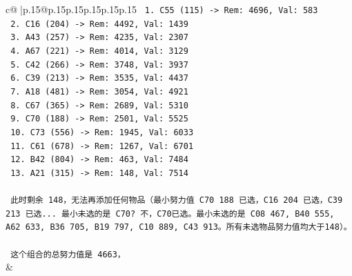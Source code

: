 \documentclass{article}
\begin{document}
{\begin{supertabular}{c@{$\;$}|p{.15\linewidth}@{}p{.15\linewidth}p{.15\linewidth}p{.15\linewidth}p{.15\linewidth}p{.15\linewidth}}
{{{\texttt{   1. C55 (115) {-}> Rem: 4696, Val: 583} \\
\texttt{   2. C16 (204) {-}> Rem: 4492, Val: 1439} \\
\texttt{   3. A43 (257) {-}> Rem: 4235, Val: 2307} \\
\texttt{   4. A67 (221) {-}> Rem: 4014, Val: 3129} \\
\texttt{   5. C42 (266) {-}> Rem: 3748, Val: 3937} \\
\texttt{   6. C39 (213) {-}> Rem: 3535, Val: 4437} \\
\texttt{   7. A18 (481) {-}> Rem: 3054, Val: 4921} \\
\texttt{   8. C67 (365) {-}> Rem: 2689, Val: 5310} \\
\texttt{   9. C70 (188) {-}> Rem: 2501, Val: 5525} \\
\texttt{   10. C73 (556) {-}> Rem: 1945, Val: 6033} \\
\texttt{   11. C61 (678) {-}> Rem: 1267, Val: 6701} \\
\texttt{   12. B42 (804) {-}> Rem: 463, Val: 7484} \\
\texttt{   13. A21 (315) {-}> Rem: 148, Val: 7514} \\
\\ 
\texttt{   此时剩余 148，无法再添加任何物品（最小努力值 C70 188 已选，C16 204 已选，C39 213 已选... 最小未选的是 C70? 不，C70已选。最小未选的是 C08 467, B40 555, A62 633, B36 705, B19 797, C10 889, C43 913。所有未选物品努力值均大于148）。} \\
\\ 
\texttt{   这个组合的总努力值是 4663，} \\
            }
        }
    }
    & \\ \\


\end{supertabular}}
\end{document}
